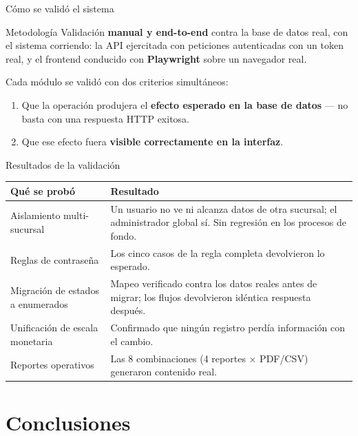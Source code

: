 \documentclass[11pt,aspectratio=169]{beamer}
\begin{document}
\begin{frame}{Cómo se validó el sistema}
  \begin{block}{Metodología}
    Validación \textbf{manual y end-to-end} contra la base de datos real, con el
    sistema corriendo: la API ejercitada con peticiones autenticadas con un token
    real, y el frontend conducido con \textbf{Playwright} sobre un navegador real.
  \end{block}

  \vspace{6pt}
  Cada módulo se validó con \alert{dos criterios simultáneos}:

  \vspace{4pt}
  \begin{enumerate}
    \item Que la operación produjera el \textbf{efecto esperado en la base de datos}
          --- no basta con una respuesta HTTP exitosa.
    \item Que ese efecto fuera \textbf{visible correctamente en la interfaz}.
  \end{enumerate}
\end{frame}

\begin{frame}{Resultados de la validación}
  \small
  \begin{tabular}{@{}p{5.0cm}p{8.6cm}@{}}
    \toprule
    \textbf{Qué se probó} & \textbf{Resultado} \\
    \midrule
    Aislamiento multi-sucursal
      & Un usuario no ve ni alcanza datos de otra sucursal; el administrador global sí. Sin regresión en los procesos de fondo. \\[3pt]
    Reglas de contraseña
      & Los cinco casos de la regla completa devolvieron lo esperado. \\[3pt]
    Migración de estados a enumerados
      & Mapeo verificado contra los datos reales antes de migrar; los flujos devolvieron idéntica respuesta después. \\[3pt]
    Unificación de escala monetaria
      & Confirmado que ningún registro perdía información con el cambio. \\[3pt]
    Reportes operativos
      & Las 8 combinaciones (4 reportes × PDF/CSV) generaron contenido real. \\
    \bottomrule
  \end{tabular}
\end{frame}

\section{Conclusiones}
\end{document}
